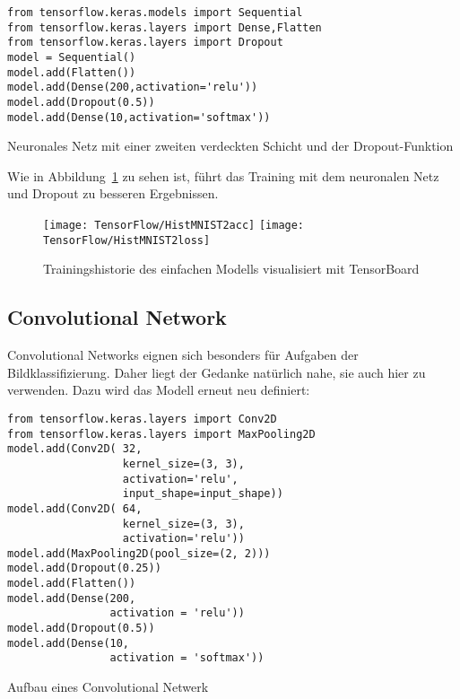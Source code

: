 \begin{code}
    \begin{lstlisting}[numbers=none]
from tensorflow.keras.models import Sequential
from tensorflow.keras.layers import Dense,Flatten
from tensorflow.keras.layers import Dropout
model = Sequential()
model.add(Flatten())
model.add(Dense(200,activation='relu'))
model.add(Dropout(0.5))
model.add(Dense(10,activation='softmax'))
\end{lstlisting}

\caption{Neuronales Netz mit einer zweiten verdeckten Schicht und der Dropout-Funktion}
\end{code}

Wie in Abbildung~\ref{HistMNIST2} zu sehen ist, führt das Training mit dem neuronalen Netz und Dropout zu besseren Ergebnissen.

\begin{figure}[H]
	\begin{center}
		\texttt{[image: TensorFlow/HistMNIST2acc]}
		\texttt{[image: TensorFlow/HistMNIST2loss]}
		\caption{Trainingshistorie des einfachen Modells visualisiert mit TensorBoard} 
		\label{HistMNIST2}
	\end{center}
\end{figure}


\subsection{Convolutional Network}

Convolutional Networks eignen sich besonders für Aufgaben der Bildklassifizierung. Daher liegt der Gedanke natürlich nahe, sie auch hier zu verwenden. Dazu wird das Modell erneut neu definiert:

	
\begin{code}
    \begin{lstlisting}[numbers=none]
from tensorflow.keras.layers import Conv2D
from tensorflow.keras.layers import MaxPooling2D
model.add(Conv2D( 32, 
                  kernel_size=(3, 3),
                  activation='relu',
                  input_shape=input_shape))
model.add(Conv2D( 64, 
                  kernel_size=(3, 3),
                  activation='relu'))
model.add(MaxPooling2D(pool_size=(2, 2)))
model.add(Dropout(0.25))
model.add(Flatten())
model.add(Dense(200,
                activation = 'relu'))
model.add(Dropout(0.5))
model.add(Dense(10,
                activation = 'softmax'))
\end{lstlisting}
\caption{Aufbau eines Convolutional Netwerk}
\end{code}


